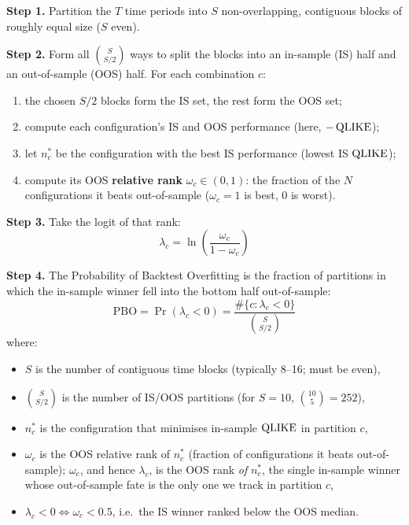 \begin{definition}
\textbf{Step 1.} Partition the $T$ time periods into $S$ non-overlapping, contiguous blocks of roughly equal size ($S$ even).

\textbf{Step 2.} Form all $\binom{S}{S/2}$ ways to split the blocks into an in-sample (IS) half and an out-of-sample (OOS) half. For each combination $c$:
\begin{enumerate}[nosep]
  \item the chosen $S/2$ blocks form the IS set, the rest form the OOS set;
  \item compute each configuration's IS and OOS performance (here, $-\operatorname{QLIKE}$);
  \item let $n^*_c$ be the configuration with the best IS performance (lowest IS $\operatorname{QLIKE}$);
  \item compute its OOS \textbf{relative rank} $\omega_c \in (0,1)$: the fraction of the $N$ configurations it beats out-of-sample ($\omega_c = 1$ is best, $0$ is worst).
\end{enumerate}

\textbf{Step 3.} Take the logit of that rank:
\begin{equation}
\label{eq:ch16-pbo-logit}
\lambda_c = \ln\!\left(\frac{\omega_c}{1 - \omega_c}\right)
\end{equation}

\textbf{Step 4.} The Probability of Backtest Overfitting is the fraction of partitions in which the in-sample winner fell into the bottom half out-of-sample:
\begin{equation}
\label{eq:ch16-pbo}
\text{PBO} = \Pr(\lambda_c < 0) = \frac{\#\{c : \lambda_c < 0\}}{\binom{S}{S/2}}
\end{equation}
where:
\begin{itemize}[nosep]
  \item $S$ is the number of contiguous time blocks (typically 8--16; must be even),
  \item $\binom{S}{S/2}$ is the number of IS/OOS partitions (for $S=10$, $\binom{10}{5}=252$),
  \item $n^*_c$ is the configuration that minimises in-sample $\operatorname{QLIKE}$ in partition $c$,
  \item $\omega_c$ is the OOS relative rank of $n^*_c$ (fraction of configurations it beats out-of-sample); $\omega_c$, and hence $\lambda_c$, is the OOS rank \emph{of} $n^*_c$, the single in-sample winner whose out-of-sample fate is the only one we track in partition $c$,
  \item $\lambda_c < 0 \iff \omega_c < 0.5$, i.e.\ the IS winner ranked below the OOS median.
\end{itemize}
\end{definition}

